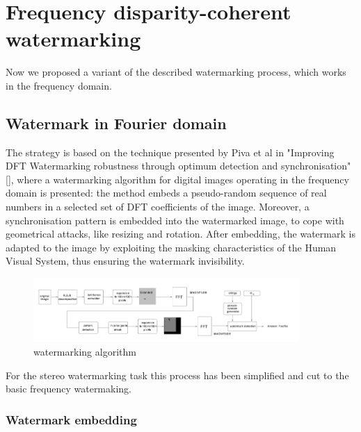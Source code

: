 \chapter{Frequency disparity-coherent watermarking}
\label{dft}

Now we proposed a variant of the described watermarking process, which works in the frequency domain.

\section{Watermark in Fourier domain}

The strategy is based on the technique presented by Piva et al in "Improving DFT Watermarking robustness through optimum detection and synchronisation" [], where a watermarking algorithm for digital images operating in the frequency domain is presented: the method embeds a pseudo-random sequence of real numbers in a selected set of DFT coefficients of the image. Moreover, a synchronisation pattern is embedded into the watermarked image, to cope with geometrical attacks, like resizing and rotation. After embedding, the watermark is adapted to the image by exploiting the masking characteristics of the Human Visual System, thus ensuring the watermark invisibility.\newline
\begin{figure}[h!]
\centering
\includegraphics[width=0.9\textwidth]{./img/blocchi.png}
\caption{\small{watermarking algorithm}}
\label{fig:blocchi}
\end{figure}

For the stereo watermarking task this process has been simplified and cut to the basic frequency watermaking.

\subsection{Watermark embedding}

